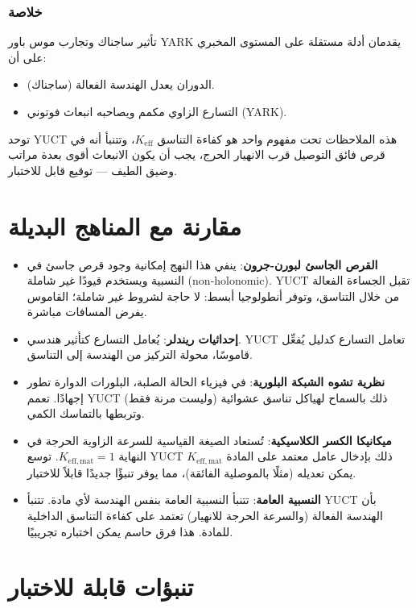 \documentclass[12pt,a4paper]{article}
\begin{document}
	\subsubsection{خلاصة}
	
	تأثير ساجناك وتجارب موس باور YARK يقدمان أدلة مستقلة على المستوى المخبري على أن:
	\begin{itemize}
		\item الدوران يعدل الهندسة الفعالة (ساجناك).
		\item التسارع الزاوي مكمم ويصاحبه انبعاث فوتوني (YARK).
	\end{itemize}
	توحد YUCT هذه الملاحظات تحت مفهوم واحد هو كفاءة التناسق \(K_{\mathrm{eff}}\)، وتتنبأ أنه في قرص فائق التوصيل قرب الانهيار الحرج، يجب أن يكون الانبعاث أقوى بعدة مراتب وضيق الطيف — توقيع قابل للاختبار.
	
	\section{مقارنة مع المناهج البديلة}
	\label{sec:comparison}
	
	\begin{itemize}
		\item \textbf{القرص الجاسئ لبورن-جرون}: ينفي هذا النهج إمكانية وجود قرص جاسئ في النسبية ويستخدم قيودًا غير شاملة (non‑holonomic). YUCT تقبل الجساءة الفعالة من خلال التناسق، وتوفر أنطولوجيا أبسط: لا حاجة لشروط غير شاملة؛ القاموس يفرض المسافات مباشرة.
		\item \textbf{إحداثيات ريندلر}: يُعامل التسارع كتأثير هندسي. YUCT تعامل التسارع كدليل يُفعِّل قاموسًا، محولة التركيز من الهندسة إلى التناسق.
		\item \textbf{نظرية تشوه الشبكة البلورية}: في فيزياء الحالة الصلبة، البلورات الدوارة تطور إجهادًا. تعمم YUCT ذلك بالسماح لهياكل تناسق عشوائية (وليست مرنة فقط) وتربطها بالتماسك الكمي.
		\item \textbf{ميكانيكا الكسر الكلاسيكية}: تُستعاد الصيغة القياسية للسرعة الزاوية الحرجة في النهاية \(K_{\mathrm{eff,mat}} = 1\). توسع YUCT ذلك بإدخال عامل معتمد على المادة \(K_{\mathrm{eff,mat}}\) يمكن تعديله (مثلًا بالموصلية الفائقة)، مما يوفر تنبؤًا جديدًا قابلاً للاختبار.
		\item \textbf{النسبية العامة}: تتنبأ النسبية العامة بنفس الهندسة لأي مادة. تتنبأ YUCT بأن الهندسة الفعالة (والسرعة الحرجة للانهيار) تعتمد على كفاءة التناسق الداخلية للمادة. هذا فرق حاسم يمكن اختباره تجريبيًا.
	\end{itemize}
	
	\section{تنبؤات قابلة للاختبار}
	\label{sec:predict}
	
\end{document}
